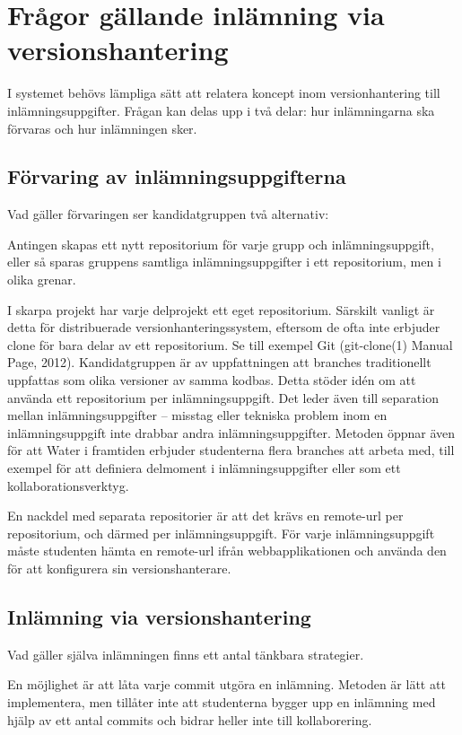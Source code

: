 \section{Frågor gällande inlämning via versionshantering}
I systemet behövs lämpliga sätt att relatera koncept inom versionhantering till inlämningsuppgifter. Frågan kan delas upp i två delar: hur inlämningarna ska förvaras och hur inlämningen sker.

\subsection{Förvaring av inlämningsuppgifterna}
Vad gäller förvaringen ser kandidatgruppen två alternativ:

Antingen skapas ett nytt repositorium för varje grupp och inlämningsuppgift, eller så sparas gruppens samtliga inlämningsuppgifter i ett repositorium, men i olika grenar.

I skarpa projekt har varje delprojekt ett eget repositorium. Särskilt vanligt är detta för distribuerade versionhanteringssystem, eftersom de ofta inte erbjuder clone för bara delar av ett repositorium. Se till exempel Git (git-clone(1) Manual Page, 2012). Kandidatgruppen är av uppfattningen att branches traditionellt uppfattas som olika versioner av samma kodbas. Detta stöder idén om att använda ett repositorium per inlämningsuppgift. Det leder även till separation mellan inlämningsuppgifter – misstag eller tekniska problem inom en inlämningsuppgift inte drabbar andra inlämningsuppgifter. Metoden öppnar även för att Water i framtiden erbjuder studenterna flera branches att arbeta med, till exempel för att definiera delmoment i inlämningsuppgifter eller som ett kollaborationsverktyg.

En nackdel med separata repositorier är att det krävs en remote-url per repositorium, och därmed per inlämningsuppgift. För varje inlämningsuppgift måste studenten hämta en remote-url ifrån webbapplikationen och använda den för att konfigurera sin versionshanterare.

\subsection{Inlämning via versionshantering}
Vad gäller själva inlämningen finns ett antal tänkbara strategier.

En möjlighet är att låta varje commit utgöra en inlämning. Metoden är lätt att implementera, men tillåter inte att studenterna bygger upp en inlämning med hjälp av ett antal commits och bidrar heller inte till kollaborering.

